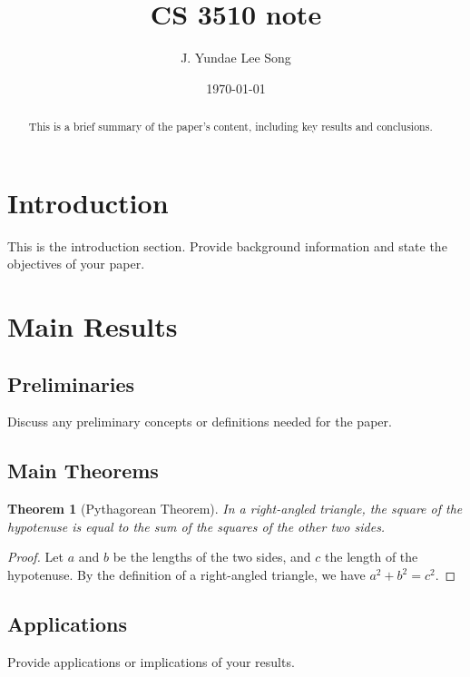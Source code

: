 \documentclass[12pt]{article}
\title{CS 3510 note}
\author{J. Yundae Lee Song}
\date{\today}
\newtheorem{theorem}{Theorem}[section]
\begin{document}
\maketitle
\begin{abstract}
This is a brief summary of the paper's content, including key results and conclusions.
\end{abstract}
\tableofcontents
\newpage
\section{Introduction}
This is the introduction section. Provide background information and state the objectives of your paper.
\newpage
\section{Main Results}
\subsection{Preliminaries}
Discuss any preliminary concepts or definitions needed for the paper.

\subsection{Main Theorems}
\begin{theorem}[Pythagorean Theorem]
In a right-angled triangle, the square of the hypotenuse is equal to the sum of the squares of the other two sides.
\end{theorem}

\begin{proof}
Let \(a\) and \(b\) be the lengths of the two sides, and \(c\) the length of the hypotenuse. By the definition of a right-angled triangle, we have \(a^2 + b^2 = c^2\).
\end{proof}

\subsection{Applications}
Provide applications or implications of your results.
\newpage
\end{document}
